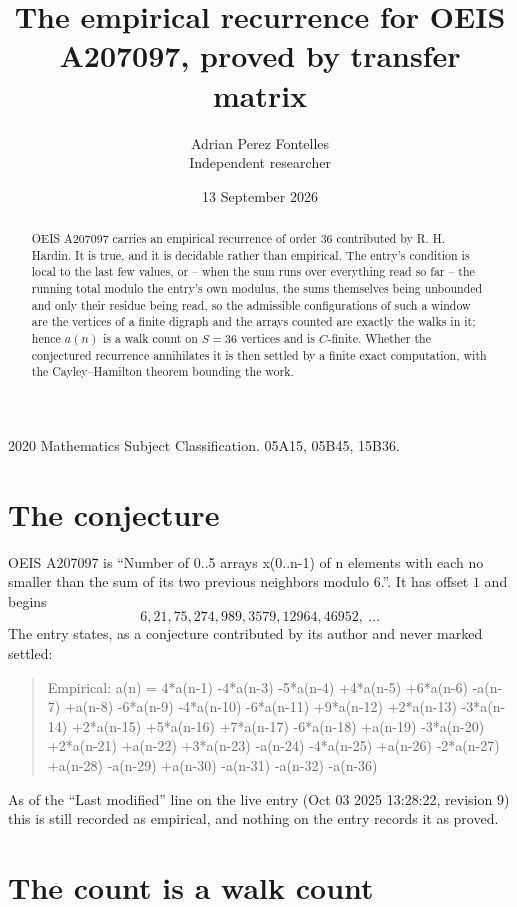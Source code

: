 \documentclass[11pt,a4paper]{article}
\title{The empirical recurrence for OEIS A207097, proved by transfer matrix}
\author{Adrian Perez Fontelles\\ \small Independent researcher}
\date{13 September 2026}
\theoremstyle{plain}
\theoremstyle{definition}
\begin{document}
\maketitle

\begin{abstract}
OEIS A207097 carries an empirical recurrence of order $36$ contributed by R. H. Hardin. It is
true, and it is decidable rather than empirical. The entry's condition is local to the last few values, or -- when the sum runs over everything read so far -- the running total modulo the entry's own modulus, the sums themselves being unbounded and only their residue being read, so
the admissible configurations of such a window are the vertices of a finite digraph and the
arrays counted are exactly the walks in it; hence $a(n)$ is a walk count on $S=36$ vertices
and is $C$-finite. Whether the conjectured recurrence annihilates it is then settled by a
finite exact computation, with the Cayley--Hamilton theorem bounding the work.
\end{abstract}

\noindent\small 2020 Mathematics Subject Classification. 05A15, 05B45, 15B36.\normalsize

\section{The conjecture}

OEIS A207097 is ``Number of 0..5 arrays x(0..n-1) of n elements with each no smaller than the sum of its two previous neighbors modulo 6.''. It has offset $1$ and begins
\[
6, 21, 75, 274, 989, 3579, 12964, 46952,\ \dots
\]
The entry states, as a conjecture contributed by its author and never marked settled:
\begin{quote}
Empirical: a(n) = 4*a(n-1) -4*a(n-3) -5*a(n-4) +4*a(n-5) +6*a(n-6) -a(n-7) +a(n-8) -6*a(n-9) -4*a(n-10) -6*a(n-11) +9*a(n-12) +2*a(n-13) -3*a(n-14) +2*a(n-15) +5*a(n-16) +7*a(n-17) -6*a(n-18) +a(n-19) -3*a(n-20) +2*a(n-21) +a(n-22) +3*a(n-23) -a(n-24) -4*a(n-25) +a(n-26) -2*a(n-27) +a(n-28) -a(n-29) +a(n-30) -a(n-31) -a(n-32) -a(n-36)
\end{quote}
As of the ``Last modified'' line on the live entry (Oct 03 2025 13:28:22, revision 9) this is still
recorded as empirical, and nothing on the entry records it as proved.

\section{The count is a walk count}
\end{document}
